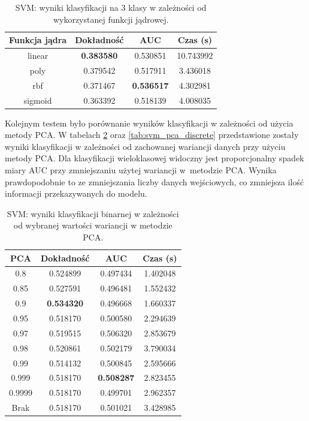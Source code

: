 \documentclass[a4paper, twoside, 11pt, openright]{article}
\begin{document}
\begin{table}[H]
    \centering
    \begin{tabular}{|c|c|c|c|}
    \hline
        \textbf{Funkcja jądra} & \textbf{Dokładność} & \textbf{AUC} & \textbf{Czas (s)} \\ \hline
linear  &  \textbf{0.383580} &  0.530851 &   10.743992 \\ \hline
poly    &  0.379542 &  0.517911 &    3.436018 \\ \hline
rbf     &  0.371467 &  \textbf{0.536517} &    4.302981 \\ \hline
sigmoid &  0.363392 &  0.518139 &    4.008035 \\ \hline
    \end{tabular}
    \caption{SVM: wyniki klasyfikacji na 3 klasy w zależności od wykorzystanej funkcji jądrowej.}
    \label{tab:svm_kernel_discrete}
\end{table}


Kolejnym testem było porównanie wyników klasyfikacji w zależności od użycia metody PCA. W tabelach \ref{tab:svm_pca_binary} oraz \ref{tab:svm_pca_discrete} przedstawione zostały wyniki klasyfikacji w zależności od zachowanej wariancji danych przy użyciu metody PCA. Dla klasyfikacji wieloklasowej widoczny jest proporcjonalny spadek miary AUC przy zmniejszaniu użytej wariancji w~metodzie PCA. Wynika prawdopodobnie to ze zmniejszania liczby danych wejściowych, co zmniejsza ilość informacji przekazywanych do modelu.


\begin{table}[H]
    \centering
    \begin{tabular}{|c|c|c|c|}
    \hline
        \textbf{PCA} & \textbf{Dokładność} &  \textbf{AUC} &  \textbf{Czas (s)} \\ \hline
0.8                &  0.524899 &  0.497434 &    1.402048 \\ \hline
0.85               &  0.527591 &  0.496481 &    1.552432 \\ \hline
0.9                &  \textbf{0.534320} &  0.496668 &    1.660337 \\ \hline
0.95               &  0.518170 &  0.500580 &    2.294639 \\ \hline
0.97               &  0.519515 &  0.506320 &    2.853679 \\ \hline
0.98               &  0.520861 &  0.502179 &    3.790034 \\ \hline
0.99               &  0.514132 &  0.500845 &    2.595666 \\ \hline
0.999 				&  0.518170 &  \textbf{0.508287} &    2.823455 \\ \hline
0.9999             &  0.518170 &  0.499701 &    2.962357 \\ \hline
Brak                &  0.518170 &  0.501021 &    3.428985 \\ \hline
    \end{tabular}
    \caption{SVM: wyniki klasyfikacji binarnej w zależności od wybranej wartości wariancji w metodzie PCA.}
    \label{tab:svm_pca_binary}
\end{table}
\end{document}
